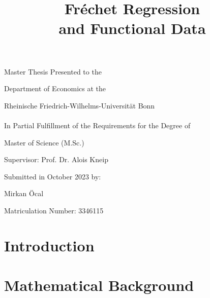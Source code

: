\documentclass[12pt, a4paper, bibtotoc]{scrartcl}
\theoremstyle{break}
\begin{document}
\begin{titlepage}
    \title{
        Fréchet Regression \\
        and Functional Data
    }
    \vspace{\fill}
    \author{}
    \date{}
    \maketitle

    \vspace{\fill}
    \begin{center}
        \large
        Master Thesis Presented to the

        Department of Economics at the

        Rheinische Friedrich-Wilhelms-Universität Bonn \\
        \ \\

        In Partial Fulfillment of the Requirements for the Degree of

        Master of Science (M.Sc.)

        \vspace{\fill}
        Supervisor: Prof. Dr. Alois Kneip

        \vspace{\fill}
        Submitted in October 2023 by:

        Mirkan Öcal

        Matriculation Number: 3346115
    \end{center}

    \thispagestyle{empty}
\end{titlepage}


\newpage %
\tableofcontents    %
\newpage %
\listoffigures      %

\newpage
{}

\section{Introduction}
\label{sec:introduction}


\section{Mathematical Background}
\label{sec:maths}

\end{document}
